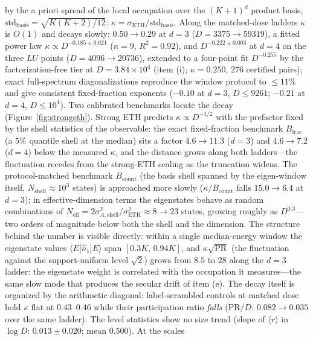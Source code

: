 \begin{remark}
by the a priori spread of the local occupation over the $(K+1)^{d}$ product basis,
$\mathrm{std}_{\mathrm{basis}}=\sqrt{K(K+2)/12}$:
$\kappa=\sigma_{\mathrm{ETH}}/\mathrm{std}_{\mathrm{basis}}$. Along the matched-dose
ladders $\kappa$ is $O(1)$ and decays slowly: $0.50\to0.29$ at $d=3$
($D=3375\to59319$), a fitted power law $\kappa\propto D^{-0.185\pm0.021}$ ($n=9$,
$R^{2}=0.92$), and $D^{-0.222\pm0.003}$ at $d=4$ on the three $LU$ points
($D=4096\to20736$), extended to a four-point fit $D^{-0.255}$ by the
factorization-free tier at $D=3.84\times10^{4}$ (item (i); $\kappa=0.250$, $276$ certified
pairs); exact full-spectrum
diagonalizations reproduce the window protocol to $\leq11\%$ and give consistent
fixed-fraction exponents ($-0.10$ at $d=3$, $D\leq9261$; $-0.21$ at $d=4$, $D\leq10^{4}$).
Two calibrated benchmarks locate the decay (Figure~\ref{fig:strongeth}). Strong ETH predicts
$\kappa\propto D^{-1/2}$ with the prefactor fixed by the shell statistics of the observable:
the exact fixed-fraction benchmark $B_{\mathrm{frac}}$ (a $5\%$ quantile shell at the median)
sits a factor $4.6\to11.3$ ($d=3$) and $4.6\to7.2$ ($d=4$) below the measured $\kappa$, and
the distance grows along both ladders---the fluctuation recedes from the strong-ETH scaling
as the truncation widens. The protocol-matched benchmark $B_{\mathrm{count}}$ (the basis shell
spanned by the eigen-window itself, $N_{\mathrm{shell}}\approx10^{3}$ states) is approached
more slowly ($\kappa/B_{\mathrm{count}}$ falls $15.0\to6.4$ at $d=3$); in effective-dimension
terms the eigenstates behave as random combinations of
$N_{\mathrm{eff}}=2\sigma_{A,\mathrm{shell}}^{2}/\sigma_{\mathrm{ETH}}^{2}\approx8\to23$ states,
growing roughly as $D^{0.3}$---two orders of magnitude below both the shell and the
dimension. The structure behind the number is visible directly: within a single
median-energy window the eigenstate values $\langle E|\hat n_{1}|E\rangle$ span $[0.3K,\,0.94K]$,
and $\kappa\sqrt{\mathrm{PR}}$ (the fluctuation against the support-uniform level $\sqrt{2}$)
grows from $8.5$ to $28$ along the $d=3$ ladder: the eigenstate weight is correlated with the
occupation it measures---the same slow mode that produces the secular drift of item (e). The
decay itself is organized by the arithmetic diagonal: label-scrambled controls at matched
dose hold $\kappa$ flat at $0.43$--$0.46$ while their participation ratio \emph{falls}
($\mathrm{PR}/D$: $0.082\to0.035$ over the same ladder). The level statistics show no size
trend (slope of $\langle r\rangle$ in $\log D$: $0.013\pm0.020$; mean $0.500$). At the scales

\end{remark}
